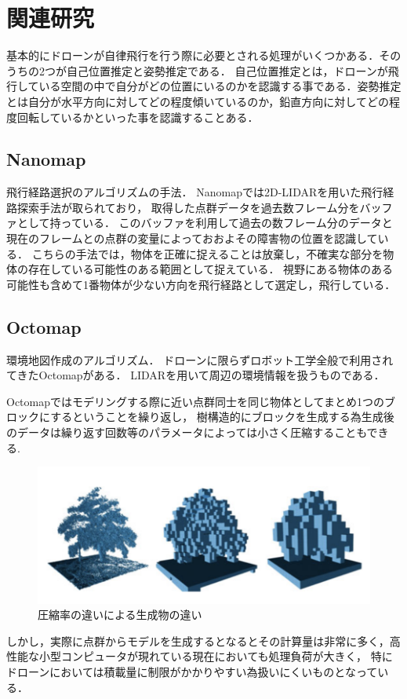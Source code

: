 \chapter{関連研究}
\label{related_works}

基本的にドローンが自律飛行を行う際に必要とされる処理がいくつかある．そのうちの2つが自己位置推定と姿勢推定である．
自己位置推定とは，ドローンが飛行している空間の中で自分がどの位置にいるのかを認識する事である．姿勢推定とは自分が水平方向に対してどの程度傾いているのか，鉛直方向に対してどの程度回転しているかといった事を認識することある．

\section{Nanomap}
飛行経路選択のアルゴリズムの手法．
Nanomapでは2D-LIDARを用いた飛行経路探索手法が取られており， 取得した点群データを過去数フレーム分をバッファとして持っている．
このバッファを利用して過去の数フレーム分のデータと現在のフレームとの点群の変量によっておおよその障害物の位置を認識している．
こちらの手法では，物体を正確に捉えることは放棄し，不確実な部分を物体の存在している可能性のある範囲として捉えている．
視野にある物体のある可能性も含めて1番物体が少ない方向を飛行経路として選定し，飛行している．

\section{Octomap}
環境地図作成のアルゴリズム．
ドローンに限らずロボット工学全般で利用されてきたOctomap\cite{Octomap}がある．
LIDARを用いて周辺の環境情報を扱うものである．

Octomapではモデリングする際に近い点群同士を同じ物体としてまとめ1つのブロックにするということを繰り返し，
樹構造的にブロックを生成する為生成後のデータは繰り返す回数等のパラメータによっては小さく圧縮することもできる.
\begin{figure}[htbp]
  \begin{center}
    \includegraphics[clip,width=15.0cm]{img/octomap.png}
    \caption{圧縮率の違いによる生成物の違い}
    \label{fig:hamu}
  \end{center}
\end{figure}
しかし，実際に点群からモデルを生成するとなるとその計算量は非常に多く，高性能な小型コンピュータが現れている現在においても処理負荷が大きく，
特にドローンにおいては積載量に制限がかかりやすい為扱いにくいものとなっている．

